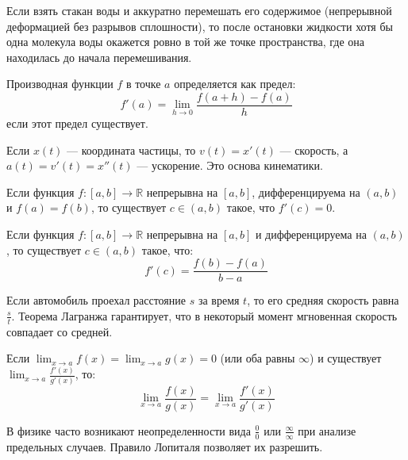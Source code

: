 \documentclass[11pt, a4paper]{extarticle}
\newcommand{\R}{{\mathbb R}}
\begin{document}
\begin{example}
Если взять стакан воды и аккуратно перемешать его содержимое (непрерывной деформацией без разрывов сплошности), то после остановки жидкости хотя бы одна молекула воды окажется ровно в той же точке пространства, где она находилась до начала перемешивания.
\end{example}


\begin{definition}[Производная]
Производная функции $f$ в точке $a$ определяется как предел:
$$f'(a) = \lim_{h \to 0} \frac{f(a + h) - f(a)}{h}$$
если этот предел существует.
\end{definition}

\begin{example}
Если $x(t)$ --- координата частицы, то $v(t) = x'(t)$ --- скорость, а $a(t) = v'(t) = x''(t)$ --- ускорение. Это основа кинематики.
\end{example}

\begin{theorem}
Если функция $f: [a, b] \to \R$ непрерывна на $[a, b]$, дифференцируема на $(a, b)$ и $f(a) = f(b)$, то существует $c \in (a, b)$ такое, что $f'(c) = 0$.
\end{theorem}

\begin{theorem}
Если функция $f: [a, b] \to \R$ непрерывна на $[a, b]$ и дифференцируема на $(a, b)$, то существует $c \in (a, b)$ такое, что:
$$f'(c) = \frac{f(b) - f(a)}{b - a}$$
\end{theorem}

\begin{example}
Если автомобиль проехал расстояние $s$ за время $t$, то его средняя скорость равна $\frac{s}{t}$. Теорема Лагранжа гарантирует, что в некоторый момент мгновенная скорость совпадает со средней.
\end{example}

\begin{theorem}
Если $\lim_{x \to a} f(x) = \lim_{x \to a} g(x) = 0$ (или оба равны $\infty$) и существует $\lim_{x \to a} \frac{f'(x)}{g'(x)}$, то:
$$\lim_{x \to a} \frac{f(x)}{g(x)} = \lim_{x \to a} \frac{f'(x)}{g'(x)}$$
\end{theorem}

\begin{example}
В физике часто возникают неопределенности вида $\frac{0}{0}$ или $\frac{\infty}{\infty}$ при анализе предельных случаев. Правило Лопиталя позволяет их разрешить.
\end{example}
\end{document}
